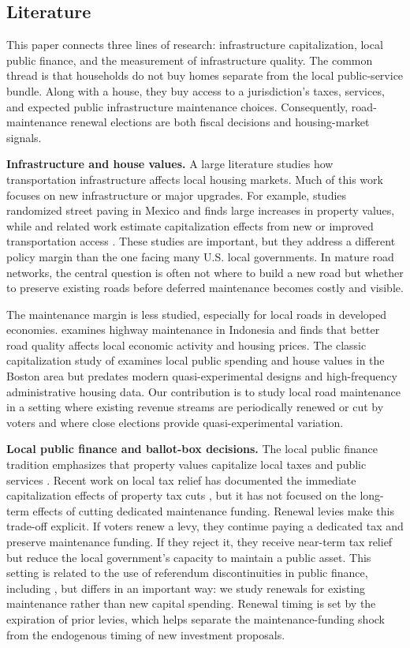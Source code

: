 \subsection{Literature}  \label{sec:lit_review}

This paper connects three lines of research: infrastructure capitalization, local public finance, and the measurement of infrastructure quality. 
The common thread is that households do not buy homes separate from the local public-service bundle. Along with a house, they buy access to a jurisdiction's taxes, services, and expected public infrastructure maintenance choices. Consequently, road-maintenance renewal elections are both fiscal decisions and housing-market signals.

{\bf Infrastructure and house values.} A large literature studies how transportation infrastructure affects local housing markets. Much of this work focuses on new infrastructure or major upgrades. For example, \cite{gonzalez2016paving} studies randomized street paving in Mexico and finds large increases in property values, while \cite{theisen2021road} and related work estimate capitalization effects from new or improved transportation access \citep{dube2018bus}. These studies are important, but they address a different policy margin than the one facing many U.S. local governments. In mature road networks, the central question is often not where to build a new road but whether to preserve existing roads before deferred maintenance becomes costly and visible.

The maintenance margin is less studied, especially for local roads in developed economies. \cite{gertler2024road} examines highway maintenance in Indonesia and finds that better road quality affects local economic activity and housing prices. The classic capitalization study of \cite{edel1974taxes} examines local public spending and house values in the Boston area but predates modern quasi-experimental designs and high-frequency administrative housing data. Our contribution is to study local road maintenance in a setting where existing revenue streams are periodically renewed or cut by voters and where close elections provide quasi-experimental variation.

{\bf Local public finance and ballot-box decisions.} The local public finance tradition emphasizes that property values capitalize local taxes and public services \citep{Oates1969, Oates1972}. Recent work on local tax relief has documented the immediate capitalization effects of property tax cuts \citep{moulton2018benefits}, but it has not focused on the long-term effects of cutting dedicated maintenance funding. Renewal levies make this trade-off explicit. If voters renew a levy, they continue paying a dedicated tax and preserve maintenance funding. If they reject it, they receive near-term tax relief but reduce the local government's capacity to maintain a public asset. This setting is related to the use of referendum discontinuities in public finance, including \cite{cellini2010value}, but differs in an important way: we study renewals for existing maintenance rather than new capital spending. Renewal timing is set by the expiration of prior levies, which helps separate the maintenance-funding shock from the endogenous timing of new investment proposals.

